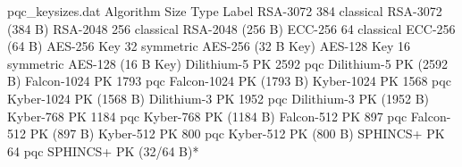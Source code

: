 
\begin{filecontents*}{pqc_keysizes.dat}
Algorithm               Size    Type        Label
{RSA-3072}              384     classical   {RSA-3072 (384 B)}
{RSA-2048}              256     classical   {RSA-2048 (256 B)}
{ECC-256}               64      classical   {ECC-256 (64 B)}
{AES-256 Key}           32      symmetric   {AES-256 (32 B Key)}
{AES-128 Key}           16      symmetric   {AES-128 (16 B Key)}
{Dilithium-5 PK}        2592    pqc         {Dilithium-5 PK (2592 B)}
{Falcon-1024 PK}        1793    pqc         {Falcon-1024 PK (1793 B)}
{Kyber-1024 PK}         1568    pqc         {Kyber-1024 PK (1568 B)}
{Dilithium-3 PK}        1952    pqc         {Dilithium-3 PK (1952 B)} %
{Kyber-768 PK}          1184    pqc         {Kyber-768 PK (1184 B)}
{Falcon-512 PK}         897     pqc         {Falcon-512 PK (897 B)} %
{Kyber-512 PK}          800     pqc         {Kyber-512 PK (800 B)}
{SPHINCS+ PK}           64      pqc         {SPHINCS+ PK (32/64 B)*} %
\end{filecontents*}

